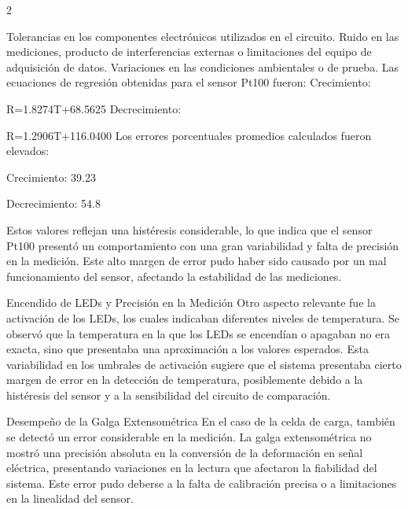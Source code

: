 \documentclass{article}
\begin{document}
\begin{multicols}{2}
\vspace{0.1cm}

Tolerancias en los componentes electrónicos utilizados en el circuito.
Ruido en las mediciones, producto de interferencias externas o limitaciones del equipo de adquisición de datos.
Variaciones en las condiciones ambientales o de prueba.
Las ecuaciones de regresión obtenidas para el sensor Pt100 fueron:
\vspace{0.2cm}
Crecimiento: 

R=1.8274T+68.5625
\vspace{0.1cm}
Decrecimiento: 

R=1.2906T+116.0400
\vspace{0.2cm}
Los errores porcentuales promedios calculados fueron elevados:

Crecimiento: 39.23%

Decrecimiento: 54.8%

\vspace{0.2cm}

Estos valores reflejan una histéresis considerable, lo que indica que el sensor Pt100 presentó un comportamiento con una gran variabilidad y falta de precisión en la medición. Este alto margen de error pudo haber sido causado por un mal funcionamiento del sensor, afectando la estabilidad de las mediciones.

\vspace{0.2cm}

Encendido de LEDs y Precisión en la Medición
Otro aspecto relevante fue la activación de los LEDs, los cuales indicaban diferentes niveles de temperatura. Se observó que la temperatura en la que los LEDs se encendían o apagaban no era exacta, sino que presentaba una aproximación a los valores esperados. Esta variabilidad en los umbrales de activación sugiere que el sistema presentaba cierto margen de error en la detección de temperatura, posiblemente debido a la histéresis del sensor y a la sensibilidad del circuito de comparación.

\vspace{0.2cm}

Desempeño de la Galga Extensométrica
En el caso de la celda de carga, también se detectó un error considerable en la medición. La galga extensométrica no mostró una precisión absoluta en la conversión de la deformación en señal eléctrica, presentando variaciones en la lectura que afectaron la fiabilidad del sistema. Este error pudo deberse a la falta de calibración precisa o a limitaciones en la linealidad del sensor.







\end{multicols}
\end{document}
